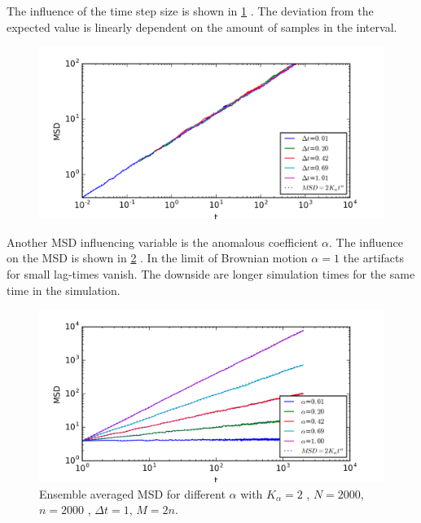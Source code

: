 \documentclass[
  a4paper,BCOR10mm,oneside,
  bibtotoc,idxtotoc,
  headsepline,footsepline,%
  fleqn,openbib
]{scrbook}
\begin{document}
\newline \noindent The influence of the time step size is shown in \cref{fig:3} . The deviation from the expected value is linearly dependent on the amount of samples in the interval.
\begin{figure}[h!]
  \centering
  \includegraphics[width=\textwidth]{./data/dt_change.png}
  \captionsetup{width=\linewidth}
  \label{fig:3}
\end{figure} 
\noindent Another MSD influencing variable is the anomalous coefficient $\alpha$. The influence on the MSD is shown in \cref{alphachange} . In the limit of Brownian motion $\alpha=1$ the artifacts for small lag-times vanish. The downside are longer simulation times for the same time in the simulation.
\begin{figure}[h!]
\centering
\includegraphics[width=\textwidth]{./data/alpha_change.png}
\caption{Ensemble averaged MSD for different $\alpha$  with $K_{\alpha}=2$ , $N=2000$, $n=2000$ , $\Delta t = 1$, $M=2n$.}
\label{alphachange}
\end{figure}
\end{document}
